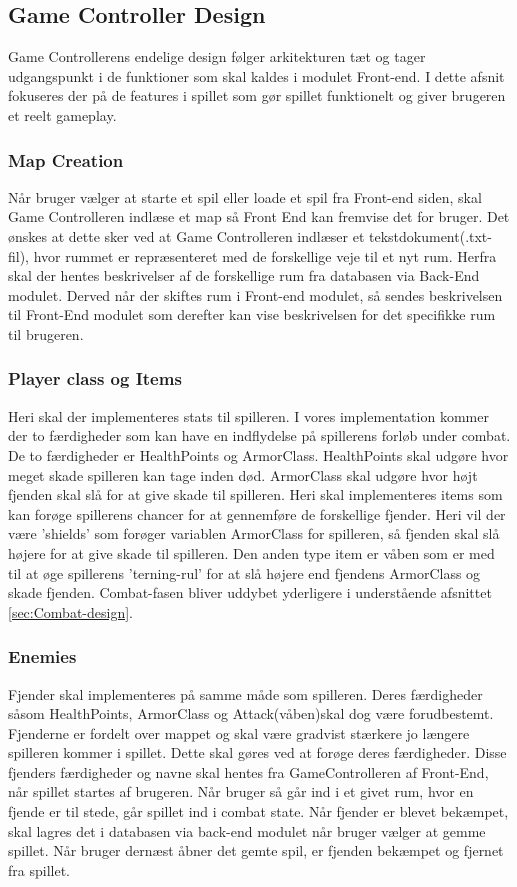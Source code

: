 \subsection{Game Controller Design}
Game Controllerens endelige design følger arkitekturen tæt og tager udgangspunkt i de funktioner som skal kaldes i modulet Front-end. I dette afsnit fokuseres der på de features i spillet som gør spillet funktionelt og giver brugeren et reelt gameplay.

\subsubsection{Map Creation}
Når bruger vælger at starte et spil eller loade et spil fra Front-end siden, skal Game Controlleren indlæse et map så Front End kan fremvise det for bruger. Det ønskes at dette sker ved at Game Controlleren indlæser et tekstdokument(.txt-fil), hvor rummet er repræsenteret med de forskellige veje til et nyt rum. Herfra skal der hentes beskrivelser af de forskellige rum fra databasen via Back-End modulet. Derved når der skiftes rum i Front-end modulet, så sendes beskrivelsen til Front-End modulet som derefter kan vise beskrivelsen for det specifikke rum til brugeren.

\subsubsection{Player class og Items}
\label{sec:Player class og Items}
Heri skal der implementeres stats til spilleren. I vores implementation kommer der to færdigheder som kan have en indflydelse på spillerens forløb under combat. De to færdigheder er HealthPoints og ArmorClass. HealthPoints skal udgøre hvor meget skade spilleren kan tage inden død. ArmorClass skal udgøre hvor højt fjenden skal slå for at give skade til spilleren. Heri skal implementeres items som kan forøge spillerens chancer for at gennemføre de forskellige fjender. Heri vil der være 'shields' som forøger variablen ArmorClass for spilleren, så fjenden skal slå højere for at give skade til spilleren. Den anden type item er våben som er med til at øge spillerens 'terning-rul' for at slå højere end fjendens ArmorClass og skade fjenden. Combat-fasen bliver uddybet yderligere i understående afsnittet \autoref{sec:Combat-design}.

\subsubsection{Enemies}
Fjender skal implementeres på samme måde som spilleren. Deres færdigheder såsom HealthPoints, ArmorClass og Attack(våben)skal dog være forudbestemt. Fjenderne er fordelt over mappet og skal være gradvist stærkere jo længere spilleren kommer i spillet. Dette skal gøres ved at forøge deres færdigheder. Disse fjenders færdigheder og navne skal hentes fra GameControlleren af Front-End, når spillet startes af brugeren. Når bruger så går ind i et givet rum, hvor en fjende er til stede, går spillet ind i combat state. Når fjender er blevet bekæmpet, skal lagres det i databasen via back-end modulet når bruger vælger at gemme spillet. Når bruger dernæst åbner det gemte spil, er fjenden bekæmpet og fjernet fra spillet.
